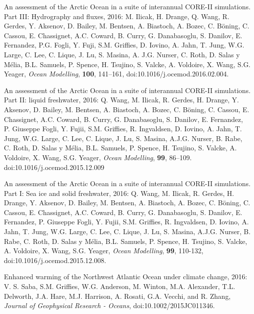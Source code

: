 \begin{etaremune}
\item An assessment of the Arctic Ocean in a suite of interannual
  CORE-II simulations. Part III: Hydrography and fluxes, 2016:
  M. Ilicak, H. Drange, Q. Wang, R. Gerdes, Y. Aksenov, D. Bailey,
  M. Bentsen, A. Biastoch, A. Bozec, C. B\"{o}ning, C. Cassou,
  E. Chassignet, A.C. Coward, B. Curry, G. Danabasoglu, S. Danilov,
  E. Fernandez, P.G. Fogli, Y. Fuji, S.M. Grif\/f\/ies,
  D. Iovino, A. Jahn, T. Jung, W.G. Large, C. Lee, C. Lique, J. Lu,
  S. Masina, A. J.G. Nurser, C. Roth, D. Salas y M\'{e}lia,
  B.L. Samuels, P. Spence, H. Tsujino, S. Valcke, A. Voldoire,
  X. Wang, S.G. Yeager, {\it Ocean Modelling}, {\bf 100}, 141--161,
  doi:10.1016/j.ocemod.2016.02.004.

\item An assessment of the Arctic Ocean in a suite of interannual
  CORE-II simulations. Part II: liquid freshwater, 2016: Q. Wang,
  M. Ilicak, R. Gerdes, H. Drange, Y. Aksenov, D. Bailey, M. Bentsen,
  A. Biastoch, A. Bozec, C. B\"{o}ning, C.  Cassou, E. Chassignet,
  A.C. Coward, B. Curry, G. Danabasoglu, S. Danilov, E. Fernandez,
  P. Giuseppe Fogli, Y. Fujii, S.M. Grif\/f\/ies, R. Ingvaldsen,
  D. Iovino, A. Jahn, T. Jung, W.G. Large, C. Lee, C. Lique, J. Lu,
  S. Masina, A.J.G. Nurser, B. Rabe, C. Roth, D. Salas y M\'elia,
  B.L. Samuels, P. Spence, H. Tsujino, S. Valcke, A. Voldoire,
  X. Wang, S.G. Yeager, {\it Ocean Modelling}, {\bf 99}, 86--109.  doi:10.1016/j.ocemod.2015.12.009

\item An assessment of the Arctic Ocean in a suite of interannual
  CORE-II simulations. Part I: Sea ice and solid freshwater, 2016:
  Q. Wang, M. Ilicak, R. Gerdes, H. Drange, Y. Aksenov, D. Bailey,
  M. Bentsen, A. Biastoch, A. Bozec, C. B\"{o}ning, C.  Cassou,
  E. Chassignet, A.C. Coward, B. Curry, G. Danabasoglu, S. Danilov,
  E. Fernandez, P. Giuseppe Fogli, Y. Fujii, S.M. Grif\/f\/ies,
  R. Ingvaldsen, D. Iovino, A. Jahn, T. Jung, W.G. Large, C. Lee,
  C. Lique, J. Lu, S. Masina, A.J.G. Nurser, B. Rabe, C. Roth,
  D. Salas y M\'elia, B.L. Samuels, P. Spence, H. Tsujino, S. Valcke,  A. Voldoire, X. Wang, S.G. Yeager, {\it Ocean Modelling}, {\bf 99}, 110-132, doi:10.1016/j.ocemod.2015.12.008.

\item Enhanced warming of the Northwest Atlantic Ocean under climate
  change, 2016: V. S. Saba, S.M. Grif\/f\/ies, W.G. Anderson,
  M. Winton, M.A. Alexander, T.L. Delworth, J.A. Hare, M.J. Harrison, A. Rosati, G.A. Vecchi, and R. Zhang, {\it Journal of Geophysical Research - Oceans}, doi:10.1002/2015JC011346.


\end{etaremune}
